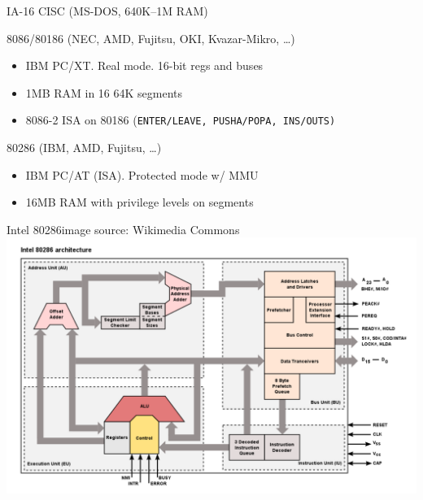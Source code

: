 \documentclass[mathserif,xcolor={dvipsnames,table}]{beamer}
\begin{document}
\begin{frame}[t]{IA-16 CISC (MS-DOS, 640K--1M RAM)}
\begin{block}{8086/80186 (NEC, AMD, Fujitsu, OKI, Kvazar-Mikro, \ldots)}
\begin{itemize}
\item IBM PC/XT. Real mode. 16-bit regs and buses
\item 1MB RAM in 16 64K segments
\item 8086-2 ISA on 80186
{\footnotesize
(\tt{ENTER}/\tt{LEAVE}, \tt{PUSHA}/\tt{POPA}, \tt{INS}/\tt{OUTS})
}
\end{itemize}
\end{block}
\begin{block}{80286 (IBM, AMD, Fujitsu, \ldots)}
\begin{itemize}
\item IBM PC/AT (ISA). Protected mode w/ MMU
\item 16MB RAM with privilege levels on segments
\end{itemize}
\end{block}
\vfill
\begin{center}
\end{center}
\end{frame}

\begin{frame}{Intel 80286\hfill\tiny{image source: Wikimedia Commons}}
\includegraphics[width=\textwidth]{images/80286.pdf}
\end{frame}
\end{document}
